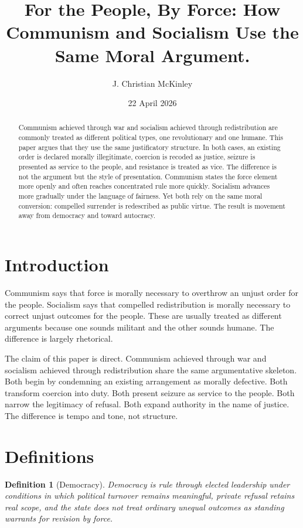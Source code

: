 \documentclass[12pt,letterpaper]{article}
\title{For the People, By Force: How Communism and Socialism Use the Same Moral Argument.}
\author{J. Christian McKinley}
\date{22 April 2026}
\newtheorem{definition}[proposition]{Definition}
\begin{document}
\maketitle

\begin{abstract}
Communism achieved through war and socialism achieved through redistribution are commonly
treated as different political types, one revolutionary and one humane. This paper argues
that they use the same justificatory structure. In both cases, an existing order is declared
morally illegitimate, coercion is recoded as justice, seizure is presented as service to the
people, and resistance is treated as vice. The difference is not the argument but the style
of presentation. Communism states the force element more openly and often reaches
concentrated rule more quickly. Socialism advances more gradually under the language of
fairness. Yet both rely on the same moral conversion: compelled surrender is redescribed
as public virtue. The result is movement away from democracy and toward autocracy.
\end{abstract}

\section{Introduction}

Communism says that force is morally necessary to overthrow an unjust order for the people.
Socialism says that compelled redistribution is morally necessary to correct unjust outcomes
for the people. These are usually treated as different arguments because one sounds militant
and the other sounds humane. The difference is largely rhetorical.

The claim of this paper is direct. Communism achieved through war and socialism achieved
through redistribution share the same argumentative skeleton. Both begin by condemning an
existing arrangement as morally defective. Both transform coercion into duty. Both present
seizure as service to the people. Both narrow the legitimacy of refusal. Both expand authority
in the name of justice. The difference is tempo and tone, not structure.

\section{Definitions}

\begin{definition}[Democracy]
Democracy is rule through elected leadership under conditions in which political turnover
remains meaningful, private refusal retains real scope, and the state does not treat ordinary
unequal outcomes as standing warrants for revision by force.
\end{definition}
\end{document}
